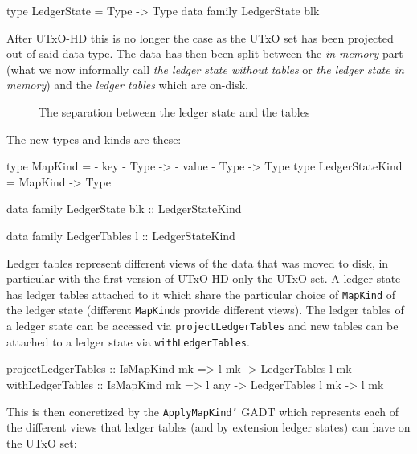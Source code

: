 \documentclass[11pt,a4paper]{article}
\newcommand{\htt}[1]{\texttt{#1}}
\theoremstyle{definition}
\begin{document}
\begin{code}
type LedgerState = Type -> Type
data family LedgerState blk
\end{code}

After UTxO-HD this is no longer the case as the UTxO set has been projected out
of said data-type. The data has then been split between the \emph{in-memory}
part (what we now informally call \emph{the ledger state without tables} or
\emph{the ledger state in memory}) and the \emph{ledger tables} which are
on-disk.

\begin{figure}[h]
  \centering
  \caption{The separation between the ledger state and the tables}
\end{figure}

The new types and kinds are these:

\begin{code}
type MapKind         = {- key -} Type -> {- value -} Type -> Type
type LedgerStateKind = MapKind -> Type

data family LedgerState blk :: LedgerStateKind

data family LedgerTables l :: LedgerStateKind
\end{code}

Ledger tables represent different views of the data that was moved to disk, in
particular with the first version of UTxO-HD only the UTxO set. A ledger state
has ledger tables attached to it which share the particular choice of \htt{MapKind} of the ledger state (different \htt{MapKind}s provide different
views). The ledger tables of a ledger state can be accessed via \htt{projectLedgerTables} and new tables can be attached to a ledger state via \htt{withLedgerTables}.

\begin{code}
projectLedgerTables :: IsMapKind mk => l mk  -> LedgerTables l mk
withLedgerTables    :: IsMapKind mk => l any -> LedgerTables l mk -> l mk
\end{code}

This is then concretized by the \htt{ApplyMapKind'} GADT which represents each
of the different views that ledger tables (and by extension ledger states) can
have on the UTxO set:
\end{document}
